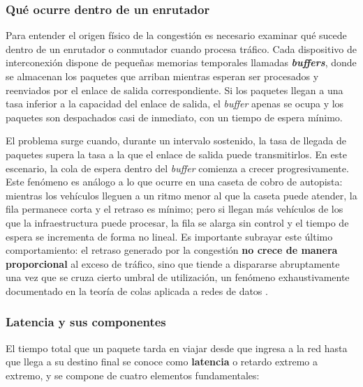 \documentclass[12pt]{report}
\begin{document}
\subsubsection*{Qué ocurre dentro de un enrutador}

Para entender el origen físico de la congestión es necesario examinar qué sucede dentro de un enrutador o conmutador cuando procesa tráfico. Cada dispositivo de interconexión dispone de pequeñas memorias temporales llamadas \textbf{\textit{buffers}}, donde se almacenan los paquetes que arriban mientras esperan ser procesados y reenviados por el enlace de salida 
correspondiente. Si los paquetes llegan a una tasa inferior a la capacidad del enlace de salida, el \textit{buffer} apenas se ocupa y los paquetes son despachados casi de inmediato, con un tiempo de espera mínimo.

El problema surge cuando, durante un intervalo sostenido, la tasa de llegada de paquetes supera la tasa a la que el enlace de salida puede transmitirlos. En este escenario, la cola de espera dentro del \textit{buffer} comienza a crecer progresivamente. Este fenómeno es análogo a lo que ocurre en una caseta de cobro de autopista: mientras los vehículos lleguen a 
un ritmo menor al que la caseta puede atender, la fila permanece corta y el retraso es mínimo; pero si llegan más vehículos de los que la infraestructura puede procesar, la fila se alarga sin control y el tiempo de espera se incrementa de forma no lineal. Es importante subrayar este último comportamiento: el retraso generado por la congestión 
\textbf{no crece de manera proporcional} al exceso de tráfico, sino que tiende a dispararse abruptamente una vez que se cruza cierto umbral de utilización, un fenómeno exhaustivamente documentado en la teoría de colas aplicada a redes de datos \cite{kleinrock1976}.

\subsubsection*{Latencia y sus componentes}

El tiempo total que un paquete tarda en viajar desde que ingresa a la red hasta que llega a su destino final se conoce como \textbf{latencia} o retardo extremo a extremo, y se compone de cuatro elementos fundamentales:
\end{document}
